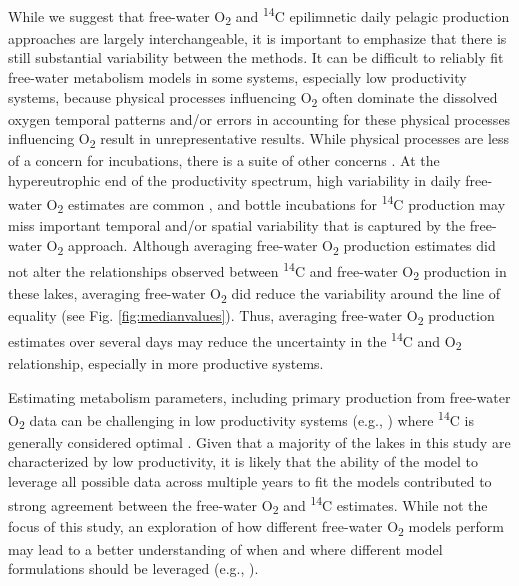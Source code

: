 \documentclass[12pt, oneside]{article}
\begin{document}
While we suggest that free-water O\textsubscript{2} and \textsuperscript{14}C epilimnetic daily pelagic production approaches are largely interchangeable, it is important to emphasize that there is still substantial variability between the methods. It can be difficult to reliably fit free-water metabolism models in some systems, especially low productivity systems, because physical processes influencing O\textsubscript{2} often dominate the dissolved oxygen temporal patterns and/or errors in accounting for these physical processes influencing O\textsubscript{2} result in unrepresentative results. While physical processes are less of a concern for incubations, there is a suite of other concerns \citep{hall_measuring_2007}. At the hypereutrophic end of the productivity spectrum, high variability in daily free-water O\textsubscript{2} estimates are common \citep{Williamson_Vanni_Renwick_2020}, and bottle incubations for \textsuperscript{14}C production may miss important temporal and/or spatial variability that is captured by the free-water O\textsubscript{2} approach. Although averaging free-water O\textsubscript{2} production estimates did not alter the relationships observed between \textsuperscript{14}C and free-water  O\textsubscript{2} production in these lakes, averaging free-water O\textsubscript{2} did reduce the variability around the line of equality (see Fig. \ref{fig:medianvalues}). Thus, averaging free-water O\textsubscript{2} production estimates over several days may reduce the uncertainty in the \textsuperscript{14}C and O\textsubscript{2} relationship, especially in more productive systems.

Estimating metabolism parameters, including primary production from free-water O\textsubscript{2} data can be challenging in low productivity systems (e.g., \citealt{Richardson_Carey_Bruesewitz_Weathers_2017, McNair_Sesselmann_Kendall_Gereaux_Weinke_Biddanda_2015, Honti_Istvanovics_2019}) where \textsuperscript{14}C is generally considered optimal \citep{hall_measuring_2007}. Given that a majority of the lakes in this study are characterized by low productivity, it is likely that the ability of the \citet{phillips_timevarying_2020} model to leverage all possible data across multiple years to fit the models contributed to strong agreement between the free-water O\textsubscript{2} and  \textsuperscript{14}C estimates. While not the focus of this study, an exploration of how different free-water O\textsubscript{2} models perform may lead to a better understanding of when and where different model formulations should be leveraged (e.g., \citealt{Honti_Istvanovics_Staehr_Brighenti_Zhu_Zhu_2016,staehr_global_2016, McNair_Sesselmann_Kendall_Gereaux_Weinke_Biddanda_2015}).
\end{document}
